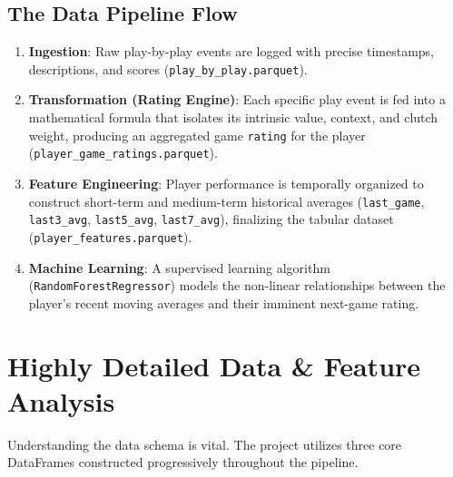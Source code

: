 \documentclass[12pt,a4paper]{article}
\begin{document}
\subsection{The Data Pipeline Flow}
\begin{enumerate}
    \item \textbf{Ingestion}: Raw play-by-play events are logged with precise timestamps, descriptions, and scores (\texttt{play\_by\_play.parquet}).
    \item \textbf{Transformation (Rating Engine)}: Each specific play event is fed into a mathematical formula that isolates its intrinsic value, context, and clutch weight, producing an aggregated game \texttt{rating} for the player (\texttt{player\_game\_ratings.parquet}).
    \item \textbf{Feature Engineering}: Player performance is temporally organized to construct short-term and medium-term historical averages (\texttt{last\_game}, \texttt{last3\_avg}, \texttt{last5\_avg}, \texttt{last7\_avg}), finalizing the tabular dataset (\texttt{player\_features.parquet}).
    \item \textbf{Machine Learning}: A supervised learning algorithm (\texttt{RandomForestRegressor}) models the non-linear relationships between the player's recent moving averages and their imminent next-game rating.
\end{enumerate}

\section{Highly Detailed Data \& Feature Analysis}
Understanding the data schema is vital. The project utilizes three core DataFrames constructed progressively throughout the pipeline.
\end{document}
